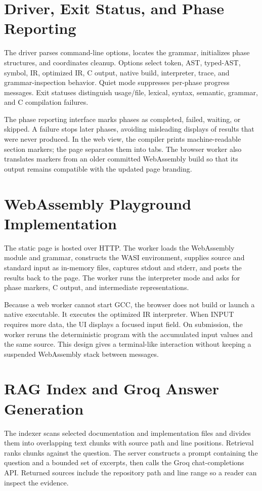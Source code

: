 \documentclass[12pt,a4paper,oneside]{report}
\newcommand{\code}[1]{\texttt{\detokenize{#1}}}
\begin{document}
\section{Driver, Exit Status, and Phase Reporting}
The \code{leoc} driver parses command-line options, locates the grammar, initializes phase structures, and coordinates cleanup. Options select token, AST, typed-AST, symbol, IR, optimized IR, C output, native build, interpreter, trace, and grammar-inspection behavior. Quiet mode suppresses per-phase progress messages. Exit statuses distinguish usage/file, lexical, syntax, semantic, grammar, and C compilation failures.

The phase reporting interface marks phases as completed, failed, waiting, or skipped. A failure stops later phases, avoiding misleading displays of results that were never produced. In the web view, the compiler prints machine-readable section markers; the page separates them into tabs. The browser worker also translates markers from an older committed WebAssembly build so that its output remains compatible with the updated page branding.

\section{WebAssembly Playground Implementation}
The static page is hosted over HTTP. The worker loads the WebAssembly module and grammar, constructs the WASI environment, supplies source and standard input as in-memory files, captures stdout and stderr, and posts the results back to the page. The worker runs the interpreter mode and asks for phase markers, C output, and intermediate representations.

Because a web worker cannot start GCC, the browser does not build or launch a native executable. It executes the optimized IR interpreter. When INPUT requires more data, the UI displays a focused input field. On submission, the worker reruns the deterministic program with the accumulated input values and the same source. This design gives a terminal-like interaction without keeping a suspended WebAssembly stack between messages.

\section{RAG Index and Groq Answer Generation}
The indexer scans selected documentation and implementation files and divides them into overlapping text chunks with source path and line positions. Retrieval ranks chunks against the question. The server constructs a prompt containing the question and a bounded set of excerpts, then calls the Groq chat-completions API. Returned sources include the repository path and line range so a reader can inspect the evidence.
\end{document}
